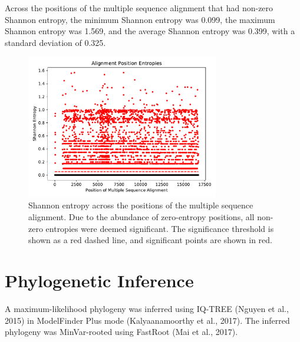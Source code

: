 \documentclass{article}
\begin{document}
 Across the positions of the multiple sequence alignment that had non-zero Shannon entropy, the minimum Shannon entropy was 0.099, the maximum Shannon entropy was 1.569, and the average Shannon entropy was 0.399, with a standard deviation of 0.325.

\begin{figure}[h]
\centering
\includegraphics[width=0.75\textwidth,keepaspectratio]{./figs/alignment_entropies.pdf}
\caption{Shannon entropy across the positions of the multiple sequence alignment. Due to the abundance of zero-entropy positions, all non-zero entropies were deemed significant. The significance threshold is shown as a red dashed line, and significant points are shown in red.}
\end{figure}

\section{Phylogenetic Inference}
A maximum-likelihood phylogeny was inferred using IQ-TREE (Nguyen et al., 2015) in ModelFinder Plus mode (Kalyaanamoorthy et al., 2017). The inferred phylogeny was MinVar-rooted using FastRoot (Mai et al., 2017).
\end{document}
